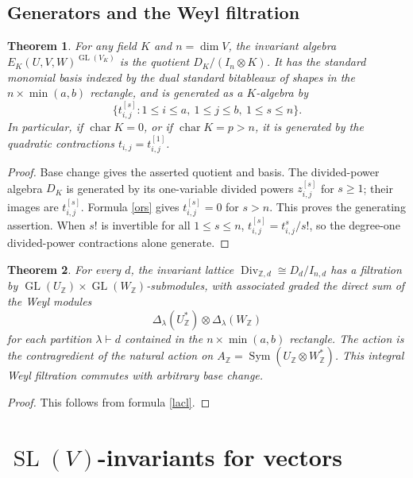 \documentclass[10pt]{amsart}
\newtheorem{theorem}{Theorem}[section]
\theoremstyle{definition}
\theoremstyle{remark}
\newcommand{\GL}{\operatorname{GL}}
\newcommand{\SL}{\operatorname{SL}}
\newcommand{\Div}{\operatorname{Div}}
\begin{document}
\subsection{Generators and the Weyl filtration}
\begin{theorem}
\label{thm:generators-all-characteristics}
For any   field $K$ and $n=\dim V$, the invariant algebra
$E_K(U,V,W)^{\GL(V_K)}$ is the quotient $D_K/(I_n\otimes K)$.
It has the standard monomial basis indexed by the dual standard
bitableaux of shapes in the $n\times\min(a,b)$ rectangle, and is
generated as a $K$-algebra by
\[
\{t_{i,j}^{[s]}:1\leq i\leq a,\ 1\leq j\leq b,\ 1\leq s\leq n\}.
\]
In particular, if $\operatorname{char}K=0$, or if
$\operatorname{char}K=p>n$, it is generated by the quadratic
contractions $t_{i,j}=t_{i,j}^{[1]}$.
\end{theorem}
\begin{proof}
Base change gives the asserted quotient and basis.
The divided-power algebra $D_K$ is generated by its one-variable
divided powers $z_{i,j}^{[s]}$ for $s\geq1$; their images are
$t_{i,j}^{[s]}$. Formula \eqref{ors}
gives
$t_{i,j}^{[s]}=0$ for $s>n$. This proves the generating assertion.
When $s!$ is invertible for all $1\leq s\leq n$,
$t_{i,j}^{[s]}=t_{i,j}^s/s!$, so the degree-one divided-power
contractions alone generate.
\end{proof}
\begin{theorem}
\label{thm:Weyl-filtration}
For every $d$, the invariant lattice
$\Div_{\mathbb Z,d}\cong D_d/I_{n,d}$ has a filtration by
$\GL(U_{\mathbb Z})\times\GL(W_{\mathbb Z})$-submodules,
with associated graded the direct sum of the Weyl modules
\begin{equation}\label{wwm}
\Delta_{\lambda }(U_{\mathbb Z}^{*})\otimes
\Delta_{\lambda }(W_{\mathbb Z})
\end{equation}
for each partition $\lambda\vdash d$ contained in the
$n\times\min(a,b)$ rectangle.  The action is the contragredient
of the natural action on $A_{\mathbb Z}=\operatorname{Sym}(U_{\mathbb Z}\otimes W_{\mathbb Z}^{*})$.
This integral Weyl filtration commutes with arbitrary base change.
\end{theorem}
\begin{proof} This follows from formula \eqref{lacl}.
\end{proof}

  \label{part:sl-so}


\section{$\SL(V)$-invariants for vectors}
\end{document}
